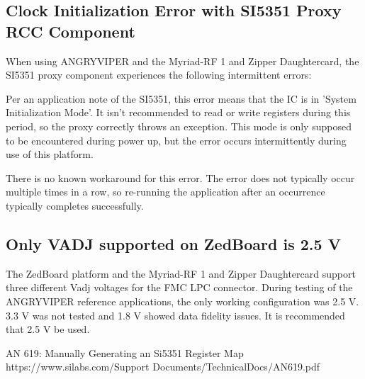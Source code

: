 \subsection*{Clock Initialization Error with SI5351 Proxy RCC Component}
When using ANGRYVIPER and the Myriad-RF 1 and Zipper Daughtercard, the SI5351 proxy component experiences the following intermittent errors:\par\medskip
\noindent {}\par\medskip
\noindent {}\par\medskip
\noindent Per an application note of the SI5351\cite{an_619}, this error means that the IC is in 'System Initialization Mode'. It isn't recommended to read or write registers during this period, so the proxy correctly throws an exception. This mode is only supposed to be encountered during power up, but the error occurs intermittently  during use of this platform.\par\medskip
\noindent There is no known workaround for this error. The error does not typically occur multiple times in a row, so re-running the application after an occurrence typically completes successfully.
\subsection*{Only VADJ supported on ZedBoard is 2.5 V}
The ZedBoard platform  and the Myriad-RF 1 and Zipper Daughtercard support three different Vadj voltages for the FMC LPC connector. During testing of the ANGRYVIPER reference applications, the only working configuration was 2.5 V. 3.3 V was not tested and 1.8 V showed data fidelity issues.  It is recommended that 2.5 V be used.
\pagebreak
  \begin{thebibliography}{1}

   AN 619: Manually Generating an Si5351 Register Map\\
  https://www.silabs.com/Support Documents/TechnicalDocs/AN619.pdf

  \end{thebibliography}
